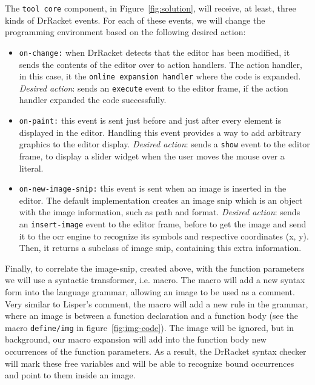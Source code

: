 The \texttt{tool core} component, in Figure~\ref{fig:solution}, will receive, at least, three kinds of DrRacket events. For each of these events, we will change the programming environment based on the following desired action:

\begin{itemize}
	\item \texttt{on-change:} when DrRacket detects that the editor has been modified, it sends the contents of the editor over to action handlers.	The action handler, in this case, it the \texttt{online expansion handler} where the code is expanded. \textit{Desired action}: sends an \texttt{execute} event to the editor frame, if the action handler expanded the code successfully. 

	\item \texttt{on-paint:} this event is sent just before and just after every element is displayed in the editor. Handling this event provides a way to add arbitrary graphics to the editor display. \textit{Desired action}: sends a \texttt{show} event to the editor frame, to display a slider widget when the user moves the mouse over a literal.

	\item \texttt{on-new-image-snip:} this event is sent when an image is inserted in the editor. The default implementation creates an image snip which is an object with the image information, such as path and format. \textit{Desired action}: sends an \texttt{insert-image} event to the editor frame, before to get the image and send it to the \ac{ocr} engine to recognize its symbols and respective coordinates (x, y). Then, it returns a subclass of image snip, containing this extra information.
\end{itemize}

Finally, to correlate the image-snip, created above, with the function parameters we will use a syntactic transformer, i.e. macro. The macro will add a new syntax form into the language grammar, allowing an image to be used as a comment. Very similar to Lisper's comment, the macro will add a new rule in the grammar, where an image is between a function declaration and a function body (see the macro \texttt{define/img} in figure~\ref{fig:img-code}). The image will be ignored, but in background, our macro expansion will add into the function body new occurrences of the function parameters. As a result, the DrRacket syntax checker will mark these free variables and will be able to recognize bound occurrences and point to them inside an image.